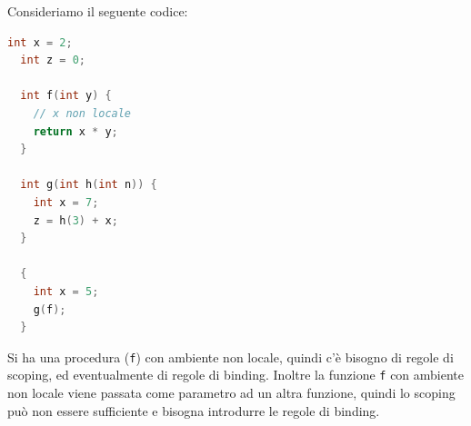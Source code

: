 \documentclass[a4paper]{article}
\begin{document}
\begin{example}
  Consideriamo il seguente codice:
\begin{lstlisting}[language=c]
  int x = 2;
  int z = 0;

  int f(int y) {
    // x non locale 
    return x * y;
  }

  int g(int h(int n)) {
    int x = 7;
    z = h(3) + x;
  }

  {
    int x = 5;
    g(f);
  }
\end{lstlisting}
  Si ha una procedura (\texttt{f}) con ambiente non locale, quindi c'è bisogno di
  regole di scoping, ed eventualmente di regole di binding. Inoltre la funzione
  \texttt{f} con ambiente non locale viene passata come parametro ad un altra
  funzione, quindi lo scoping può non essere sufficiente e bisogna introdurre le
  regole di binding.


\end{example}
\end{document}
